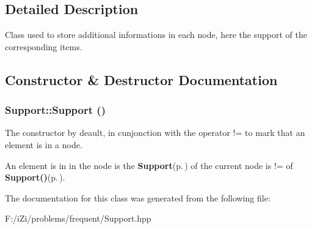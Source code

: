 \subsection{Detailed Description}
Class used to store additional informations in each node, here the support of the corresponding items. 



\subsection{Constructor \& Destructor Documentation}
\subsubsection{\setlength{\rightskip}{0pt plus 5cm}Support::Support ()\hspace{0.3cm}{\tt  [inline]}}\label{class_support_19bf40018bf3004487c65f7e68c9f65e}


The constructor by deault, in cunjonction with the operator != to mark that an element is in a node. 

An element is in in the node is the {\bf Support}{\rm (p.\,\pageref{class_support})} of the current node is != of {\bf Support()}{\rm (p.\,\pageref{class_support_19bf40018bf3004487c65f7e68c9f65e})}. 

The documentation for this class was generated from the following file:\begin{CompactItemize}
\item 
F:/i\-Zi/problems/frequent/Support.hpp\end{CompactItemize}
